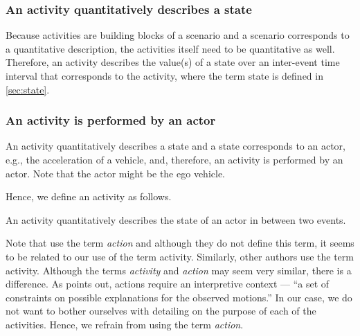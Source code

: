 \cbstart
\subsubsection{An activity quantitatively describes a state}
Because activities are building blocks of a scenario and a scenario corresponds to a quantitative description, the activities itself need to be quantitative as well. Therefore, an activity describes the value(s) of a state over an inter-event time interval that corresponds to the activity, where the term state is defined in \cref{sec:state}.

\subsubsection{An activity is performed by an actor}
An activity quantitatively describes a state and a state corresponds to an actor, e.g., the acceleration of a vehicle, and, therefore, an activity is performed by an actor. Note that the actor might be the ego vehicle. 

Hence, we define an activity as follows.
\begin{definition}[Activity]
	\label{def:activity}
	An activity quantitatively describes the state of an actor in between two events.
\end{definition}
\cbend


Note that \textcite{geyer2014, ulbrich2015} use the term \emph{action} and although they do not define this term, it seems to be related to our use of the term activity. Similarly, other authors \cite{sigsim2019glossary, catapult2018musicc, elrofai2018scenario} use the term activity. Although the terms \emph{activity} and \emph{action} may seem very similar, there is a difference. As \textcite{bobick1997movement} points out, actions require an interpretive context --- ``a set of constraints on possible explanations for the observed motions.'' In our case, we do not want to bother ourselves with detailing on the purpose of each of the activities. Hence, we refrain from using the term \emph{action}.

